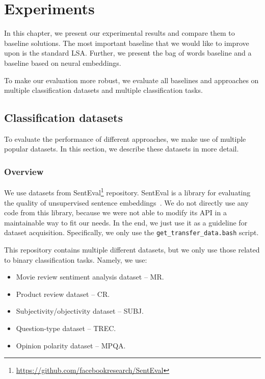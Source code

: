 \chapter{Experiments}

In this chapter, we present our experimental results and compare them to baseline solutions.
The most important baseline that we would like to improve upon is the standard LSA.
Further, we present the bag of words baseline and a baseline based on neural embeddings.

To make our evaluation more robust, we evaluate all baselines and approaches on multiple classification datasets and multiple classification tasks.

\section{Classification datasets}
    
    To evaluate the performance of different approaches, we make use of multiple popular datasets.
    In this section, we describe these datasets in more detail.
    
    \subsection{Overview} \label{sec:data:overview}
    
    We use datasets from  SentEval\footnote{\url{https://github.com/facebookresearch/SentEval}} repository.
    SentEval is a library for evaluating the quality of unsupervised sentence embeddings~\cite{conneau2017supervised}.
    We do not directly use any code from this library, because we were not able to modify its API in a maintainable way to fit our needs. 
    In the end, we just use it as a guideline for dataset acquisition.
    Specifically, we only use the \texttt{get\_transfer\_data.bash} script.
    
    This repository contains multiple different datasets, 
    but we only use those related to binary classification tasks.
    Namely, we use:
    \begin{itemize}[noitemsep]
        \item Movie review sentiment analysis dataset -- MR.
        \item Product review dataset -- CR.
        \item Subjectivity/objectivity dataset -- SUBJ.
        \item Question-type dataset -- TREC.
        \item Opinion polarity dataset -- MPQA.
    \end{itemize}
    
